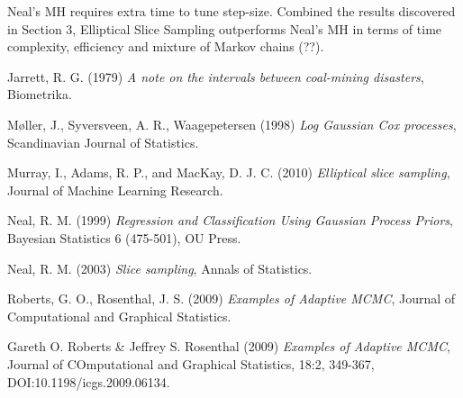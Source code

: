\documentclass{article}
\begin{document}
Neal's MH requires extra time to tune step-size. Combined the results discovered in Section 3, Elliptical Slice Sampling outperforms Neal's MH in terms of time complexity, efficiency and mixture of Markov chains (??).
\begin{thebibliography}{12}


	Jarrett, R. G.  (1979)
	\emph{A note on the intervals between coal-mining disasters},
	Biometrika.

	M{\o}ller, J., Syversveen, A. R., Waagepetersen  (1998)
	\emph{Log Gaussian Cox processes},
	Scandinavian Journal of Statistics.

	Murray, I., Adams, R. P., and MacKay, D. J. C. (2010)
	\emph{Elliptical slice sampling},
	Journal of Machine Learning Research.
	
	Neal, R. M. (1999)
	\emph{Regression and Classification Using
Gaussian Process Priors},
	Bayesian Statistics 6 (475-501), OU Press.
	
	Neal, R. M. (2003)
	\emph{Slice sampling},
	Annals of Statistics.

	Roberts, G. O., Rosenthal, J. S. (2009)
	\emph{Examples of Adaptive MCMC},
	Journal of Computational and Graphical Statistics.
	
 Gareth O. Roberts & Jeffrey S. Rosenthal (2009) \emph{Examples of Adaptive MCMC}, Journal of COmputational and Graphical Statistics, 18:2, 349-367, DOI:10.1198/icgs.2009.06134.

\end{thebibliography}
\end{document}
